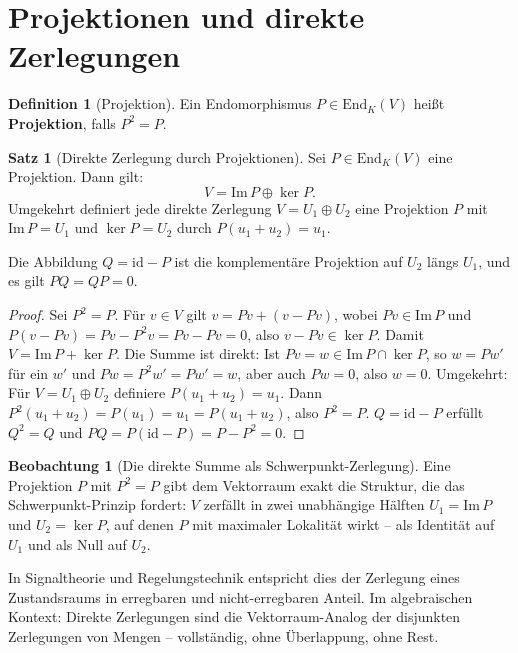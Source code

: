 ﻿\documentclass[a4paper,12pt]{report}
\theoremstyle{definition}
\newtheorem{definition}{Definition}
\newtheorem{satz}{Satz}
\newtheorem{beobachtung}{Beobachtung}
\begin{document}
\section{Projektionen und direkte Zerlegungen}

\begin{definition}[Projektion]
    Ein Endomorphismus $P \in \mathrm{End}_K(V)$ heißt
    \textbf{Projektion}, falls $P^2 = P$.
\end{definition}

\begin{satz}[Direkte Zerlegung durch Projektionen]
    Sei $P \in \mathrm{End}_K(V)$ eine Projektion. Dann gilt:
    \[
        V = \mathrm{Im}\, P \oplus \ker P.
    \]
    Umgekehrt definiert jede direkte Zerlegung $V = U_1 \oplus U_2$ eine
    Projektion $P$ mit $\mathrm{Im}\, P = U_1$ und $\ker P = U_2$ durch
    $P(u_1 + u_2) = u_1$.

    Die Abbildung $Q = \mathrm{id} - P$ ist die komplementäre Projektion
    auf $U_2$ längs $U_1$, und es gilt $PQ = QP = 0$.
\end{satz}
\begin{proof}
    Sei $P^2 = P$. Für $v \in V$ gilt $v = Pv + (v - Pv)$, wobei $Pv \in \mathrm{Im}\, P$
    und $P(v - Pv) = Pv - P^2v = Pv - Pv = 0$, also $v - Pv \in \ker P$.
    Damit $V = \mathrm{Im}\, P + \ker P$.
    Die Summe ist direkt: Ist $Pv = w \in \mathrm{Im}\, P \cap \ker P$,
    so $w = Pw' $ für ein $w'$ und $Pw = P^2w' = Pw' = w$, aber auch $Pw = 0$,
    also $w = 0$.
    Umgekehrt: Für $V = U_1 \oplus U_2$ definiere $P(u_1 + u_2) = u_1$.
    Dann $P^2(u_1 + u_2) = P(u_1) = u_1 = P(u_1 + u_2)$, also $P^2 = P$.
    $Q = \mathrm{id} - P$ erfüllt $Q^2 = Q$ und $PQ = P(\mathrm{id} - P)
    = P - P^2 = 0$.
\end{proof}


\begin{beobachtung}[Die direkte Summe als Schwerpunkt-Zerlegung]
    Eine Projektion $P$ mit $P^2 = P$ gibt dem Vektorraum exakt die
    Struktur, die das Schwerpunkt-Prinzip fordert: $V$ zerfällt in zwei
    unabhängige Hälften $U_1 = \mathrm{Im}\, P$ und $U_2 = \ker P$,
    auf denen $P$ mit maximaler Lokalität wirkt -- als Identität auf
    $U_1$ und als Null auf $U_2$.

    In Signaltheorie und Regelungstechnik entspricht dies der Zerlegung
    eines Zustandsraums in erregbaren und nicht-erregbaren Anteil.
    Im algebraischen Kontext: Direkte Zerlegungen sind die Vektorraum-Analog
    der disjunkten Zerlegungen von Mengen -- vollständig, ohne Überlappung,
    ohne Rest.
\end{beobachtung}
\end{document}
